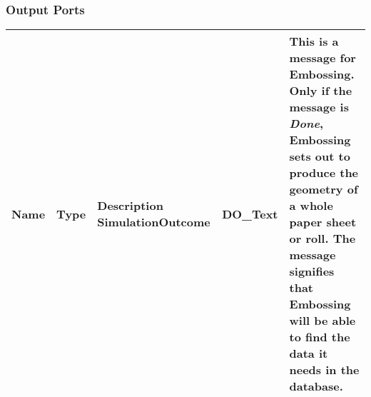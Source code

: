 \begin{htmlonly}
\begin{longtable}{|p{3.5cm}|p{4cm}|p{7cm}|}
                    
														

\hline
\end{longtable}



%
\subsubsection{Output Ports}
%

 
\begin{longtable}{|p{3.5cm}|p{4cm}|p{7cm}|}
\hline
   \bf{Name} & \bf{Type} & \bf{Description} \endhead
\hline\hline
	\textcolor{required}{SimulationOutcome} & DO\_Text& 
                          This is a message for Embossing. 
                          Only if the message is {\sl Done},
                          Embossing sets out to produce the
                          geometry of a whole paper sheet or roll.
                          The message signifies that Embossing 
                          will be able to find the data it needs
                          in the database. \\

\hline
\end{longtable}



\end{htmlonly}
